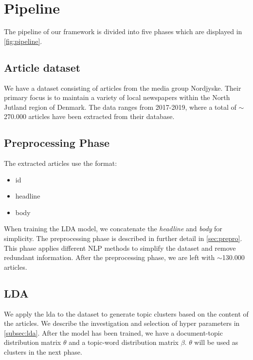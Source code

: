 \section{Pipeline}


The pipeline of our framework is divided into five phases which are displayed in \autoref{fig:pipeline}. 

\subsection{Article dataset}
We have a dataset consisting of articles from the media group Nordjyske. Their primary focus is to maintain a variety of local newspapers within the North Jutland region of Denmark. 
The data ranges from 2017-2019, where a total of $\sim$270.000 articles have been extracted from their database.

\subsection{Preprocessing Phase}
The extracted articles use the format:
\begin{itemize}
	\item id
	\item headline
	\item body
\end{itemize}
When training the LDA model, we concatenate the \emph{headline} and \emph{body} for simplicity. 
The preprocessing phase is described in further detail in \autoref{sec:prepro}.
This phase applies different \gls{NLP} methods  to simplify the dataset and remove redundant information.
After the preprocessing phase, we are left with $\sim$130.000 articles.

\subsection{LDA}
We apply the \acrfull{lda} to the dataset to generate topic clusters based on the content of the articles. 
We describe the investigation and selection of hyper parameters in \autoref{subsec:lda}. 
After the model has been trained, we have a document-topic distribution matrix $\theta$ and a topic-word distribution matrix $\beta$.
$\theta$ will be used as clusters in the next phase.

